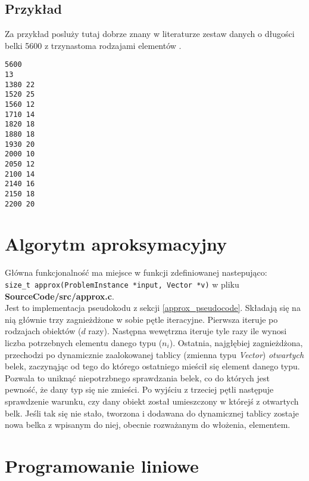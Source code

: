 \subsection{Przykład}\label{example}
Za przykład posluży tutaj dobrze znany w literaturze zestaw danych o długości belki 5600 z trzynastoma rodzajami elementów \cite{EXAMPLE_REF}.

\begin{lstlisting} 
5600
13
1380 22
1520 25
1560 12
1710 14
1820 18
1880 18
1930 20
2000 10
2050 12
2100 14
2140 16
2150 18
2200 20 
\end{lstlisting}

\section{Algorytm aproksymacyjny}
Główna funkcjonalność ma miejsce w funkcji zdefiniowanej nastepująco: \\ \verb|size_t approx(ProblemInstance *input, Vector *v)| w pliku \textbf{SourceCode/src/approx.c}. \\
Jest to implementacja pseudokodu z sekcji \ref{approx_pseudocode}.
Składają się na nią głównie trzy zagnieżdżone w sobie pętle iteracyjne.
Pierwsza iteruje po rodzajach obiektów ($d$ razy).
Następna wewętrzna iteruje tyle razy ile wynosi liczba potrzebnych elementu danego typu ($n_i$).
Ostatnia, najgłębiej zagnieżdżona, przechodzi po dynamicznie zaalokowanej tablicy (zmienna typu \textit{Vector}) \textit{otwartych} belek, zaczynąjąc od tego do którego ostatniego mieścił się element danego typu. Pozwala to uniknąć niepotrzbnego sprawdzania belek, co do których jest pewność, że dany typ się nie zmieści. 
Po wyjściu z trzeciej pętli następuje sprawdzenie warunku, czy dany obiekt został umieszczony w którejś z otwartych belk. Jeśli tak się nie stało, tworzona i dodawana do dynamicznej tablicy zostaje nowa belka z wpisanym do niej, obecnie rozważanym do włożenia, elementem.

\section{Programowanie liniowe}
